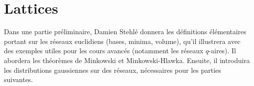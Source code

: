 \section{Lattices}

Dans une partie préliminaire, Damien Stehlé donnera les définitions
élémentaires portant sur les réseaux
euclidiens (bases, minima, volume), qu'il illustrera avec des exemples utiles
pour les
cours avancés (notamment les réseaux $q$-aires). Il abordera les théorèmes
de Minkowski et Minkowski-Hlawka. Ensuite, il introduira
les distributions gaussiennes sur des réseaux,
nécessaires pour les parties suivantes.